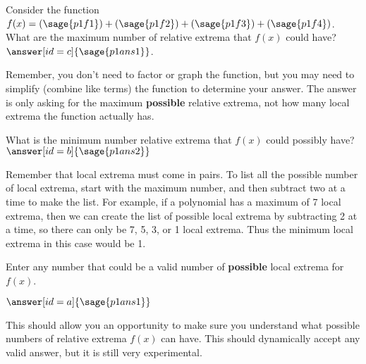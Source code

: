 \documentclass{ximera}
\begin{document}
\begin{problem}
    Consider the function $f(x) = (\sage{p1f1}) + (\sage{p1f2}) + (\sage{p1f3}) + (\sage{p1f4})$. What are the maximum number of relative extrema that $f(x)$ could have? $\answer[id=c]{\sage{p1ans1}}$.
    \begin{feedback}
        Remember, you don't need to factor or graph the function, but you may need to simplify (combine like terms) the function to determine your answer. The answer is only asking for the maximum \textbf{possible} relative extrema, not how many local extrema the function actually has.
    \end{feedback}
    \begin{problem}
        What is the minimum number relative extrema that $f(x)$ could possibly have? $\answer[id=b]{\sage{p1ans2}}$
        \begin{feedback}
            Remember that local extrema must come in pairs. To list all the possible number of local extrema, start with the maximum number, and then subtract two at a time to make the list. For example, if a polynomial has a maximum of 7 local extrema, then we can create the list of possible local extrema by subtracting 2 at a time, so there can only be 7, 5, 3, or 1 local extrema. Thus the minimum local extrema in this case would be 1. 
        \end{feedback}
        \begin{problem}
            Enter any number that could be a valid number of \textbf{possible} local extrema for $f(x)$.
            \begin{validator}[boundedSameParity(a,b,c)]
                $\answer[id=a]{\sage{p1ans1}}$
                \begin{feedback}
                    This should allow you an opportunity to make sure you understand what possible numbers of relative extrema $f(x)$ can have. This should dynamically accept any valid answer, but it is still very experimental.
                \end{feedback}
            \end{validator}
        \end{problem}
    \end{problem}
\end{problem}
\end{document}
